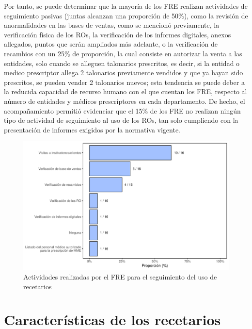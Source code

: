 \documentclass[
]{book}
\begin{document}
Por tanto, se puede determinar que la mayoría de los FRE realizan actividades de seguimiento pasivas (juntas alcanzan una proporción de 50\%), como la revisión de anormalidades en las bases de ventas, como se mencionó previamente, la verificación física de los ROs, la verificación de los informes digitales, anexos allegados, puntos que serán ampliados más adelante, o la verificación de recambios con un 25\% de proporción, la cual consiste en autorizar la venta a las entidades, solo cuando se alleguen talonarios prescritos, es decir, si la entidad o medico prescriptor allega 2 talonarios previamente vendidos y que ya hayan sido prescritos, se pueden vender 2 talonarios nuevos; esta tendencia se puede deber a la reducida capacidad de recurso humano con el que cuentan los FRE, respecto al número de entidades y médicos prescriptores en cada departamento. De hecho, el acompañamiento permitió evidenciar que el 15\% de los FRE no realizan ningún tipo de actividad de seguimiento al uso de los ROs, tan solo cumpliendo con la presentación de informes exigidos por la normativa vigente.

\begin{figure}
\includegraphics[width=0.85\linewidth]{InformeFinal_files/figure-latex/SeguimientoUsoRecetarios-1} \caption{Actividades realizadas por el FRE para el seguimiento del uso de recetarios}\label{fig:SeguimientoUsoRecetarios}
\end{figure}

\hypertarget{caracteruxedsticas-de-los-recetarios}{%
\section{Características de los recetarios}\label{caracteruxedsticas-de-los-recetarios}}

\end{document}
